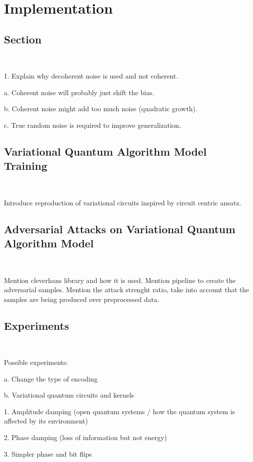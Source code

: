 \chapter{Implementation}\label{chapter:implementation}

\section{Section} \

1.	Explain why decoherent noise is used and not coherent. \

  a. Coherent noise will probably just shift the bias. \

  b. Coherent noise might add too much noise (quadratic growth). \

  c. True random noise is required to improve generalization. \


\section{Variational Quantum Algorithm Model Training}\label{section:vqa_training} \

Introduce reproduction of variational circuits inspired by circuit centric ansatz. \

\section{Adversarial Attacks on Variational Quantum Algorithm Model}\label{section:vqa_attacks} \

Mention cleverhans library and how it is used. Mention pipeline to create the adversarial samples. Mention the attack strenght ratio, take into account that the samples are being produced over preprocessed data.

\section{Experiments}\label{section:experiments} \

Possible experiments: \

a. Change the type of encoding \

b. Variational quantum circuits and kernels \

 1. Amplitude damping (open quantum systems / how the quantum system is affected by its environment) \

 2. Phase damping (loss of information but not energy) \

 3. Simpler phase and bit flips \